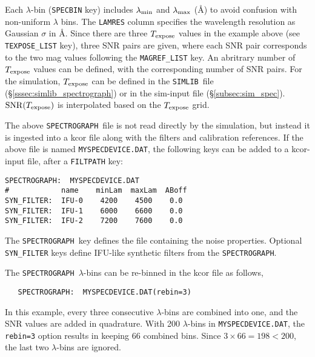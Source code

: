 \documentclass[12pt]{article}
\newcommand{\SPEC}{{\tt SPECTROGRAPH}}
\newcommand{\Texpose}{T_{\rm expose}}
\newcommand{\simlib}{{\tt SIMLIB}}
\newcommand{\lam}{\lambda}
\begin{document}
{Each $\lam$-bin ({\tt SPECBIN} key) includes 
$\lam_{\rm min}$ and $\lam_{\rm max}$ (\AA)
to avoid confusion with non-uniform $\lam$ bins. 
The {\tt LAMRES} column specifies the wavelength resolution
as Gaussian $\sigma$ in \AA.
Since there are three $\Texpose$ values in the example above
(see {\tt TEXPOSE\_LIST} key),
three SNR pairs are given, where each SNR pair corresponds
to the two mag values following the {\tt MAGREF\_LIST} key.
An abritrary number of $\Texpose$ values can be defined,
with the corresponding number of SNR pairs.
For the simulation, $\Texpose$ can be defined in the
\simlib\ file (\S\ref{sssec:simlib_spectrograph})
or in the sim-input file (\S\ref{subsec:sim_spec}).
${\rm SNR}(\Texpose)$ is interpolated based on the $\Texpose$ grid.

The above \SPEC\ file is not read directly by the simulation,
but instead it is ingested into a kcor file along with the
filters and calibration references.
If the above file is named {\tt MYSPECDEVICE.DAT},
the following keys can be added to a kcor-input file,
after a {\tt FILTPATH} key:
%
\begin{Verbatim}[frame=single]
SPECTROGRAPH:  MYSPECDEVICE.DAT
#            name    minLam  maxLam  ABoff
SYN_FILTER:  IFU-0    4200    4500    0.0
SYN_FILTER:  IFU-1    6000    6600    0.0
SYN_FILTER:  IFU-2    7200    7600    0.0 
\end{Verbatim}
The \SPEC\ key defines the file containing the noise properties.
Optional {\tt SYN\_FILTER} keys define IFU-like synthetic
filters from the \SPEC. 

The \SPEC\ $\lam$-bins can be re-binned in the kcor file
as follows,
\begin{verbatim}
   SPECTROGRAPH:  MYSPECDEVICE.DAT(rebin=3)
\end{verbatim}
%
In this example, every three consecutive $\lam$-bins are combined
into one, and the SNR values are added in quadrature. 
With 200 $\lam$-bins in {\tt MYSPECDEVICE.DAT}, the {\tt rebin=3}
option results in keeping 66 combined bins. Since $3\times 66=198 < 200$,
the last two $\lam$-bins are ignored.

\bigskip

\newcommand{\Rpredict}{{\rm R}_{\rm SNR-Poiss}}  %
\newcommand{\RSNR}{{\rm R}_{\rm SNR}}           %
\newcommand{\RRabort}{{\cal R}_{\rm Abort}}    %

}
\end{document}
